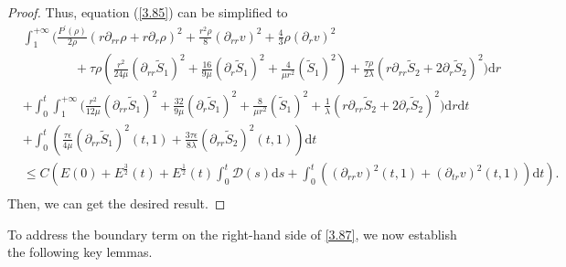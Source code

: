 \documentclass[10pt,reqno]{amsart}
\numberwithin{equation}{section}
\begin{document}
\begin{proof}
		Thus, equation (\ref{3.85}) can be simplified to 
		\begin{equation}\label{3.87}
			\begin{aligned}
				&\int_{1}^{+\infty}\bigg(\frac{ P^{\prime}(\rho)}{2\rho}\left(r\partial_{rr} \rho+r\partial_{r} \rho\right)^2
				+\frac{r^2\rho}{8} (\partial_{rr}v)^2+\frac{4}{3}\rho(\partial_{r}v)^2
				\\
				&\qquad\qquad+\tau\rho\left(\frac{r^2}{24\mu}(\partial_{rr}\tilde{S}_1)^2+\frac{16}{9\mu}(\partial_{r}\tilde{S}_1)^2+\frac{4}{\mu r^2}(\tilde{S}_1)^2\right)+\frac{\tau\rho}{2\lambda}\left(r\partial_{rr} \tilde{S}_2+2\partial_{r} \tilde{S}_2\right)^2\bigg)\mathrm{d}r\\%
				&+\int_0^t\int_{1}^{+\infty}\bigg(\frac{r^2}{12\mu}(\partial_{rr}\tilde{S}_1)^2+\frac{32}{9\mu}(\partial_{r}\tilde{S}_1)^2+\frac{8}{\mu r^2}(\tilde{S}_1)^2
				+\frac{1}{\lambda}\left(r\partial_{rr} \tilde{S}_2+2\partial_{r} \tilde{S}_2\right)^2\bigg)\mathrm{d}r\mathrm{d}t\\
				&
				+\int_{0}^{t}\left(\frac{\tau\epsilon}{4\mu}(\partial_{rr}\tilde{S}_1)^2(t,1)
				+\frac{3\tau\epsilon}{8\lambda}(\partial_{rr}\tilde{S}_2)^2(t,1)\right)\mathrm{d}t\\
				&\leq C \left(E(0)+E^{\frac{3}{2}}(t)+E^{\frac{1}{2}}(t) \int_{0}^{t}\mathcal{D}(s)\mathrm{d}s
				+\int_{0}^{t}((\partial_{rr}v)^2(t,1)+(\partial_{tr}v)^2(t,1))\mathrm{d}t\right).
				\\ 
			\end{aligned}
		\end{equation}
		Then, we can get the desired result.
	\end{proof}    
	
	To address the boundary term on the right-hand side of \eqref{3.87}, we now establish the following key lemmas.
	
\end{document}
